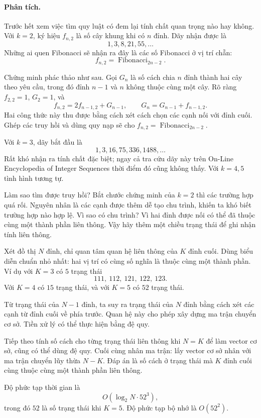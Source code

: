 \documentclass[11pt]{article}
\begin{document}
\paragraph{Phân tích.}
Trước hết xem việc tìm quy luật có đem lại tính chất quan trọng nào hay không.
Với $k=2$, ký hiệu $f_{n,2}$ là số cây khung khi có $n$ đỉnh. Dãy nhận được là
\[
  1,3,8,21,55,\ldots
\]
Những ai quen Fibonacci sẽ nhận ra đây là các số Fibonacci ở vị trí chẵn:
\[
  f_{n,2}=\operatorname{Fibonacci}_{2n-2}.
\]

Chứng minh phác thảo như sau. Gọi $G_n$ là số cách chia $n$ đỉnh thành hai cây
theo yêu cầu, trong đó đỉnh $n-1$ và $n$ không thuộc cùng một cây. Rõ ràng
$f_{2,2}=1$, $G_2=1$, và
\[
  f_{n,2}=2f_{n-1,2}+G_{n-1},\qquad
  G_n=G_{n-1}+f_{n-1,2}.
\]
Hai công thức này thu được bằng cách xét cách chọn các cạnh nối với đỉnh cuối.
Ghép các truy hồi và dùng quy nạp sẽ cho
$f_{n,2}=\operatorname{Fibonacci}_{2n-2}$.

Với $k=3$, dãy bắt đầu là
\[
  1,3,16,75,336,1488,\ldots
\]
Rất khó nhận ra tính chất đặc biệt; ngay cả tra cứu dãy này trên On-Line
Encyclopedia of Integer Sequences thời điểm đó cũng không thấy. Với $k=4,5$
tình hình tương tự.

Làm sao tìm được truy hồi? Bắt chước chứng minh của $k=2$ thì các trường hợp
quá rối. Nguyên nhân là các cạnh được thêm dễ tạo chu trình, khiến ta khó biết
trường hợp nào hợp lệ. Vì sao có chu trình? Vì hai đỉnh được nối có thể đã
thuộc cùng một thành phần liên thông. Vậy hãy thêm một chiều trạng thái để ghi
nhận tính liên thông.

Xét đồ thị $N$ đỉnh, chỉ quan tâm quan hệ liên thông của $K$ đỉnh cuối. Dùng
biểu diễn chuẩn nhỏ nhất: hai vị trí có cùng số nghĩa là thuộc cùng một thành
phần. Ví dụ với $K=3$ có $5$ trạng thái
\[
  111,\ 112,\ 121,\ 122,\ 123.
\]
Với $K=4$ có $15$ trạng thái, và với $K=5$ có $52$ trạng thái.

Từ trạng thái của $N-1$ đỉnh, ta suy ra trạng thái của $N$ đỉnh bằng cách xét
các cạnh từ đỉnh cuối về phía trước. Quan hệ này cho phép xây dựng ma trận
chuyển cơ sở. Tiền xử lý có thể thực hiện bằng đệ quy.

Tiếp theo tính số cách cho từng trạng thái liên thông khi $N=K$ để làm vector
cơ sở, cũng có thể dùng đệ quy. Cuối cùng nhân ma trận: lấy vector cơ sở nhân
với ma trận chuyển lũy thừa $N-K$. Đáp án là số cách ở trạng thái mà $K$ đỉnh
cuối cùng thuộc cùng một thành phần liên thông.

Độ phức tạp thời gian là
\[
  O(\log_2 N\cdot 52^3),
\]
trong đó $52$ là số trạng thái khi $K=5$. Độ phức tạp bộ nhớ là $O(52^2)$.
\end{document}
